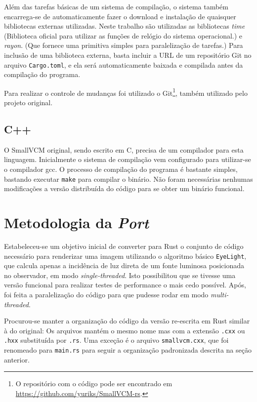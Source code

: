 \documentclass[tg]{mdtufsm}
\def\Cpp{{C\nolinebreak[4]\raisebox{.20ex}{\small\bf++}}}
\begin{document}
Além das tarefas básicas de um sistema de compilação, o sistema também encarrega-se de automaticamente fazer o download e instalação de quaisquer bibliotecas externas utilizadas. Neste trabalho são utilizadas as bibliotecas \emph{time} (Biblioteca oficial para utilizar as funções de relógio do sistema operacional.) e \emph{rayon}. (Que fornece uma primitiva simples para paralelização de tarefas.) Para inclusão de uma biblioteca externa, basta incluir a URL de um repositório Git no arquivo \texttt{Cargo.toml}, e ela será automaticamente baixada e compilada antes da compilação do programa.

Para realizar o controle de mudanças foi utilizado o Git\footnote{O repositório com o código pode ser encontrado em \url{https://github.com/yuriks/SmallVCM-rs}.}, também utilizado pelo projeto original.

\subsection{C++}

O SmallVCM original, sendo escrito em \Cpp, precisa de um compilador para esta linguagem. Inicialmente o sistema de compilação vem configurado para utilizar-se o compilador gcc. O processo de compilação do programa é bastante simples, bastando executar \texttt{make} para compilar o binário. Não foram necessárias nenhumas modificações a versão distribuída do código para se obter um binário funcional.

\section{Metodologia da \emph{Port}}

Estabeleceu-se um objetivo inicial de converter para Rust o conjunto de código necessário para renderizar uma imagem utilizando o algoritmo básico \texttt{EyeLight}, que calcula apenas a incidência de luz direta de um fonte luminosa posicionada no observador, em modo \emph{single-threaded}. Isto possibilitou que se tivesse uma versão funcional para realizar testes de performance o mais cedo possível. Após, foi feita a paralelização do código para que pudesse rodar em modo \emph{multi-threaded}.

Procurou-se manter a organização do código da versão re-escrita em Rust similar à do original: Os arquivos mantém o mesmo nome mas com a extensão \texttt{.cxx} ou \texttt{.hxx} substituída por \texttt{.rs}. Uma exceção é o arquivo \texttt{smallvcm.cxx}, que foi renomeado para \texttt{main.rs} para seguir a organização padronizada descrita na seção anterior.
\end{document}
